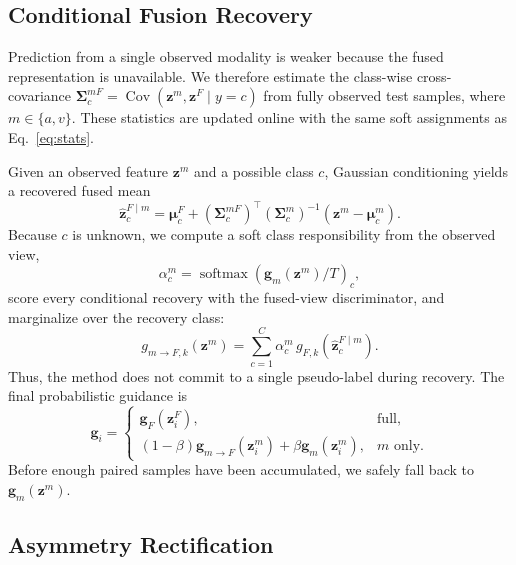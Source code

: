\subsection{Conditional Fusion Recovery}
\label{sec:recovery}

Prediction from a single observed modality is weaker because the fused
representation is unavailable.  We therefore estimate the class-wise
cross-covariance $\bm\Sigma_c^{mF}=\operatorname{Cov}(\bm z^m,\bm z^F\mid
y=c)$ from fully observed test samples, where $m\in\{a,v\}$.  These statistics
are updated online with the same soft assignments as Eq.~\eqref{eq:stats}.

Given an observed feature $\bm z^m$ and a possible class $c$, Gaussian
conditioning yields a recovered fused mean
\begin{equation}
  \widehat{\bm z}_{c}^{F\mid m}=
  \bm\mu_c^F+
  (\bm\Sigma_c^{mF})^{\top}(\bm\Sigma_c^m)^{-1}
  (\bm z^m-\bm\mu_c^m).
  \label{eq:conditional_mean}
\end{equation}
Because $c$ is unknown, we compute a soft class responsibility from the
observed view,
\begin{equation}
  \alpha_c^m=
  \operatorname{softmax}\!\left(\bm g_m(\bm z^m)/T\right)_c,
  \label{eq:responsibility}
\end{equation}
score every conditional recovery with the fused-view discriminator, and
marginalize over the recovery class:
\begin{equation}
  g_{m\rightarrow F,k}(\bm z^m)=
  \sum_{c=1}^{C}\alpha_c^m\,
  g_{F,k}\!\left(\widehat{\bm z}_{c}^{F\mid m}\right).
  \label{eq:recovery_score}
\end{equation}
Thus, the method does not commit to a single pseudo-label during recovery.
The final probabilistic guidance is
\begin{equation}
  \bm g_i=
  \begin{cases}
    \bm g_F(\bm z_i^F), & \text{full},\\
    (1-\beta)\bm g_{m\rightarrow F}(\bm z_i^m)
    +\beta\bm g_m(\bm z_i^m), & \text{$m$ only}.
  \end{cases}
  \label{eq:guidance_cases}
\end{equation}
Before enough paired samples have been accumulated, we safely fall back to
$\bm g_m(\bm z^m)$.

\subsection{Asymmetry Rectification}
\label{sec:rectification}

